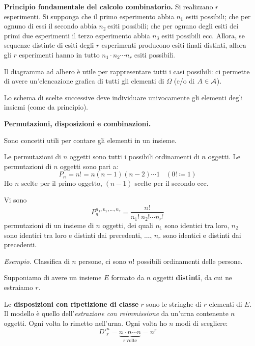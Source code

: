 \textbf{Principio fondamentale del calcolo combinatorio.} Si realizzano $r$ esperimenti. Si supponga che il primo esperimento abbia $n_{1}$ esiti possibili; che per ognuno di essi il secondo abbia $n_{2} \ $esiti possibili; che per ognuno degli esiti dei primi due esperimenti il terzo esperimento abbia $n_{3}$ esiti possibili ecc. Allora, se sequenze distinte di esiti degli $r$ esperimenti producono esiti finali distinti, allora gli $r$ esperimenti hanno in tutto $n_{1} \cdot n_{2} \cdots n_{r}$ esiti possibili.

\begin{oss}
	Il diagramma ad albero è utile per rappresentare tutti i casi possibili: ci permette di avere un'elencazione grafica di tutti gli elementi di $\Omega $ (e/o di $A\in \mathcal{A}$).
\end{oss}

\begin{oss}
	Lo schema di scelte successive deve individuare univocamente gli elementi degli insiemi (come da principio).
\end{oss}

\textbf{Permutazioni, disposizioni e combinazioni.}

Sono concetti utili per contare gli elementi in un insieme.

\begin{definition}
	Le permutazioni di $n$ oggetti sono tutti i possibili ordinamenti di $n$ oggetti. Le permutazioni di $n$ oggetti sono pari a:
	\begin{equation*}
		\boxed{P_{n} =n!=n(n-1)(n-2) \cdots 1} \ \ \ \ (0!\coloneqq 1)
	\end{equation*}
	Ho $n$ scelte per il primo oggetto, $(n-1)$ scelte per il secondo ecc.
\end{definition}

\begin{oss}
	Vi sono
	\begin{equation*}
		\boxed{P_{n}^{n_{1} ,n_{2} ,\dots ,n_{r}} =\frac{n!}{n_{1} !\ n_{2} !\cdots n_{r} !}}
	\end{equation*}
	permutazioni di un insieme di $n$ oggetti, dei quali $n_{1}$ sono identici tra loro, $n_{2}$ sono identici tra loro e distinti dai precedenti, $\dots $, $n_{r}$ sono identici e distinti dai precedenti.
\end{oss}

\textit{Esempio.} Classifica di $n$ persone, ci sono $n!$ possibili ordinamenti delle persone.

Supponiamo di avere un insieme $E$ formato da $n$ oggetti \textbf{distinti}, da cui ne estraiamo $r$.
\begin{definition}
	Le \textbf{disposizioni con ripetizione di classe }$r$ sono le stringhe di $r$ elementi di $E$. Il modello è quello dell'\textit{estrazione con reimmissione} da un'urna contenente $n$ oggetti. Ogni volta lo rimetto nell'urna. Ogni volta ho $n$ modi di scegliere:
	\begin{equation*}
		\boxed{D'^{n}_{r} =\underbrace{n\cdot n\cdots n}_{r\ \text{volte}} =n^{r}}
	\end{equation*}
\end{definition}

